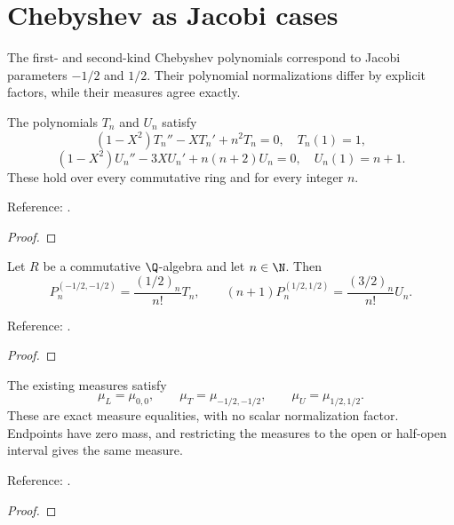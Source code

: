 \section{Chebyshev as Jacobi cases}\label{sec:textbook-classical-chebyshev}

The first- and second-kind Chebyshev polynomials correspond to Jacobi parameters $-1/2$ and $1/2$. Their polynomial normalizations differ by explicit factors, while their measures agree exactly.

\begin{theorem}
\label{thm:chebyshev-ode}
\mathlibok
The polynomials $T_n$ and $U_n$ satisfy
\[(1-X^2)T_n''-XT_n'+n^2T_n=0,\quad T_n(1)=1,\]
\[(1-X^2)U_n''-3XU_n'+n(n+2)U_n=0,\quad U_n(1)=n+1.\]
These hold over every commutative ring and for every integer $n$.

Reference: \cite[Tables 18.8.1 and 18.6.1]{dlmf}.
\end{theorem}
\begin{proof}
\mathlibok
\end{proof}

\begin{theorem}
\label{thm:chebyshev-jacobi}
\leanok
Let $R$ be a commutative $\Q$-algebra and let $n\in\N$. Then
\[P_n^{(-1/2,-1/2)}=\frac{(1/2)_n}{n!}T_n,\qquad
(n+1)P_n^{(1/2,1/2)}=\frac{(3/2)_n}{n!}U_n.\]

Reference: \cite[18.7.3--4]{dlmf}.
\end{theorem}
\begin{proof}
\leanok
\end{proof}

\begin{theorem}
\label{thm:classical-jacobi-measures}
\leanok
The existing measures satisfy
\[
 \mu_L=\mu_{0,0},\qquad \mu_T=\mu_{-1/2,-1/2},\qquad
 \mu_U=\mu_{1/2,1/2}.
\]
These are exact measure equalities, with no scalar normalization factor.
Endpoints have zero mass, and restricting the measures to the open or half-open interval gives the same measure.

Reference: \cite[Table 18.3.1]{dlmf}.
\end{theorem}
\begin{proof}
\leanok
\end{proof}

